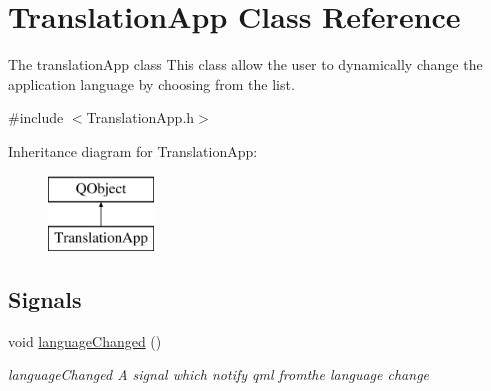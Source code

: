 \hypertarget{class_translation_app}{}\section{Translation\+App Class Reference}
\label{class_translation_app}


The translation\+App class This class allow the user to dynamically change the application language by choosing from the list.  




{\ttfamily \#include $<$Translation\+App.\+h$>$}

Inheritance diagram for Translation\+App\+:\begin{figure}[H]
\begin{center}
\leavevmode
\includegraphics[height=2.000000cm]{class_translation_app}
\end{center}
\end{figure}
\subsection*{Signals}
\begin{DoxyCompactItemize}
\item 
void \hyperlink{class_translation_app_ad4e2b88fd1f024546a80f68c3806b77b}{language\+Changed} ()
\begin{DoxyCompactList}\small\item\em language\+Changed A signal which notify qml fromthe language change \end{DoxyCompactList}\end{DoxyCompactItemize}
